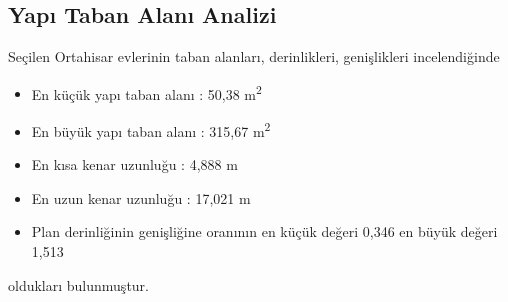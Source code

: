 \documentclass[12pt,turkish,a4paperpaper,]{report}
\providecommand{\tightlist}{%
  \setlength{\itemsep}{0pt}\setlength{\parskip}{0pt}}
\begin{document}
\hypertarget{yapux131-taban-alanux131-analizi}{%
\subsection{Yapı Taban Alanı
Analizi}\label{yapux131-taban-alanux131-analizi}}

Seçilen Ortahisar evlerinin taban alanları, derinlikleri, genişlikleri
incelendiğinde

\begin{itemize}
\tightlist
\item
  En küçük yapı taban alanı : 50,38 m\textsuperscript{2}
\item
  En büyük yapı taban alanı : 315,67 m\textsuperscript{2}
\item
  En kısa kenar uzunluğu : 4,888 m
\item
  En uzun kenar uzunluğu : 17,021 m
\item
  Plan derinliğinin genişliğine oranının en küçük değeri 0,346 en büyük
  değeri 1,513
\end{itemize}

oldukları bulunmuştur.
\end{document}
